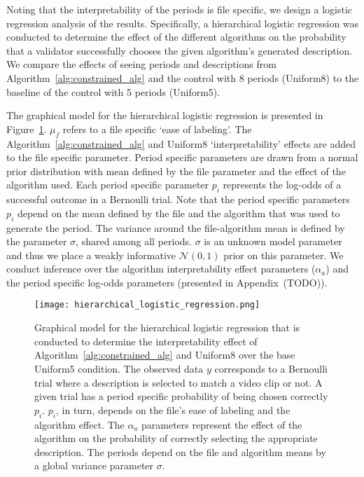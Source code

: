 Noting that the interpretability of the periods is file specific, we design a logistic regression analysis of the results. Specifically, a hierarchical logistic regression was conducted to determine the effect of the different algorithms on the probability that a validator successfully chooses the given algorithm's generated description. We compare the effects of seeing periods and descriptions from Algorithm~\ref{alg:constrained_alg} and the control with $8$ periods (Uniform8) to the baseline of the control with 5 periods (Uniform5).

The graphical model for the hierarchical logistic regression is presented in Figure~\ref{fig:hierarchical_logistic_regression}. $\mu_f$ refers to a file specific `ease of labeling'. The Algorithm~\ref{alg:constrained_alg} and Uniform8 `interpretability' effects are added to the file specific parameter. Period specific parameters are drawn from a normal prior distribution with mean defined by the file parameter and the effect of the algorithm used. Each period specific parameter $p_i$ represents the log-odds of a successful outcome in a Bernoulli trial. Note that the period specific parameters $p_i$ depend on the mean defined by the file and the algorithm that was used to generate the period. The variance around the file-algorithm mean is defined by the parameter $\sigma$, shared among all periods. $\sigma$ is an unknown model parameter and thus we place a weakly informative $\mathcal{N}(0,1)$ prior on this parameter. We conduct inference over the algorithm interpretability effect parameters ($\alpha_a$) and the period specific log-odds parameters (presented in Appendix~(TODO)).

\begin{figure}
\centering
\texttt{[image: hierarchical\_logistic\_regression.png]}
\caption{Graphical model for the hierarchical logistic regression that is conducted to determine the interpretability effect of Algorithm~\ref{alg:constrained_alg} and Uniform8 over the base Uniform5 condition. The observed data $y$ corresponds to a Bernoulli trial where a description is selected to match a video clip or not. A given trial has a period specific probability of being chosen correctly $p_i$. $p_i$, in turn, depends on the file's ease of labeling and the algorithm effect. The $\alpha_a$ parameters represent the effect of the algorithm on the probability of correctly selecting the appropriate description. The periods depend on the file and algorithm means by a global variance parameter $\sigma$.}
\label{fig:hierarchical_logistic_regression}
\end{figure}

